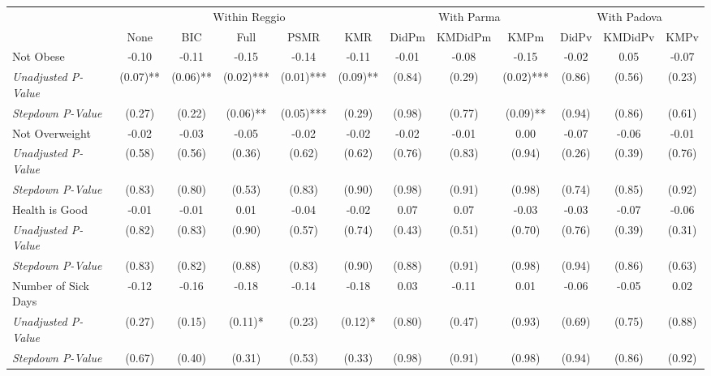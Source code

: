 \begin{tabular}{l c c c c c c c c c c c}
\toprule
& \multicolumn{5}{c}{Within Reggio} & \multicolumn{3}{c}{With Parma} & \multicolumn{3}{c}{With Padova} \\\cmidrule(lr){2-6} \cmidrule(lr){7-9} \cmidrule(lr){10-12}
 & None & BIC & Full & PSMR & KMR & DidPm & KMDidPm & KMPm & DidPv & KMDidPv & KMPv \\
\midrule
Not Obese & -0.10 & -0.11 & -0.15 & -0.14 & -0.11 & -0.01 & -0.08 & -0.15 & -0.02 & 0.05 & -0.07 \\
\quad \textit{Unadjusted P-Value} & (0.07)** & (0.06)** & (0.02)*** & (0.01)*** & (0.09)** & (0.84) & (0.29) & (0.02)*** & (0.86) & (0.56) & (0.23) \\
\quad \textit{Stepdown P-Value} & (0.27) & (0.22) & (0.06)** & (0.05)*** & (0.29) & (0.98) & (0.77) & (0.09)** & (0.94) & (0.86) & (0.61) \\
Not Overweight & -0.02 & -0.03 & -0.05 & -0.02 & -0.02 & -0.02 & -0.01 & 0.00 & -0.07 & -0.06 & -0.01 \\
\quad \textit{Unadjusted P-Value} & (0.58) & (0.56) & (0.36) & (0.62) & (0.62) & (0.76) & (0.83) & (0.94) & (0.26) & (0.39) & (0.76) \\
\quad \textit{Stepdown P-Value} & (0.83) & (0.80) & (0.53) & (0.83) & (0.90) & (0.98) & (0.91) & (0.98) & (0.74) & (0.85) & (0.92) \\
Health is Good & -0.01 & -0.01 & 0.01 & -0.04 & -0.02 & 0.07 & 0.07 & -0.03 & -0.03 & -0.07 & -0.06 \\
\quad \textit{Unadjusted P-Value} & (0.82) & (0.83) & (0.90) & (0.57) & (0.74) & (0.43) & (0.51) & (0.70) & (0.76) & (0.39) & (0.31) \\
\quad \textit{Stepdown P-Value} & (0.83) & (0.82) & (0.88) & (0.83) & (0.90) & (0.88) & (0.91) & (0.98) & (0.94) & (0.86) & (0.63) \\
Number of Sick Days & -0.12 & -0.16 & -0.18 & -0.14 & -0.18 & 0.03 & -0.11 & 0.01 & -0.06 & -0.05 & 0.02 \\
\quad \textit{Unadjusted P-Value} & (0.27) & (0.15) & (0.11)* & (0.23) & (0.12)* & (0.80) & (0.47) & (0.93) & (0.69) & (0.75) & (0.88) \\
\quad \textit{Stepdown P-Value} & (0.67) & (0.40) & (0.31) & (0.53) & (0.33) & (0.98) & (0.91) & (0.98) & (0.94) & (0.86) & (0.92) \\
\bottomrule
\end{tabular}
